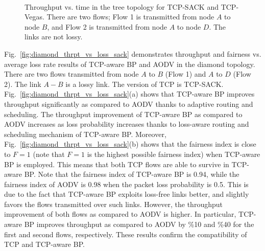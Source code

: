 \documentclass[conference]{IEEEtran}
\begin{document}
\begin{figure}[t!]
\vspace{-0pt}
\begin{center}
 \hspace{-0pt} \\
 \hspace{-0pt}
\end{center}
\begin{center}
\vspace{-5pt}
\caption{\label{fig:tree_thrpt_time_results} \scriptsize  Throughput vs. time in the tree topology for TCP-SACK and TCP-Vegas. There are two flows; Flow 1 is transmitted from node $A$ to node $B$, and Flow 2 is transmitted from node $A$ to node $D$. The links are not lossy.
}
\vspace{-15pt}
\end{center}
\vspace{-10pt}
\end{figure}



Fig.~\ref{fig:diamond_thrpt_vs_loss_sack} demonstrates throughput and fairness vs. average loss rate results of TCP-aware BP and AODV in the diamond topology. There are two flows transmitted from node $A$ to $B$ (Flow 1) and $A$ to $D$ (Flow 2). The link $A-B$ is a lossy link. The version of TCP is TCP-SACK. Fig.~\ref{fig:diamond_thrpt_vs_loss_sack}(a) shows that TCP-aware BP improves throughput significantly as compared to AODV thanks to adaptive routing and scheduling. The throughput improvement of TCP-aware BP as compared to AODV increases as loss probability increases thanks to loss-aware routing and scheduling mechanism of TCP-aware BP. Moreover, Fig.~\ref{fig:diamond_thrpt_vs_loss_sack}(b) shows that the fairness index is close to $F=1$ (note that $F=1$ is the highest possible fairness index) when TCP-aware BP is employed. This means that both TCP flows are able to survive in TCP-aware BP. Note that the fairness index of TCP-aware BP is 0.94, while the fairness index of AODV is 0.98 when the packet loss probability is 0.5. This is due to the fact that TCP-aware BP exploits loss-free links better, and slightly favors the flows transmitted over such links. However, the throughput improvement of both flows as compared to AODV is higher. In particular, TCP-aware BP improves throughput as compared to AODV by \%10 and \%40 for the first and second flows, respectively. These results confirm the compatibility of TCP and TCP-aware BP.
\end{document}
